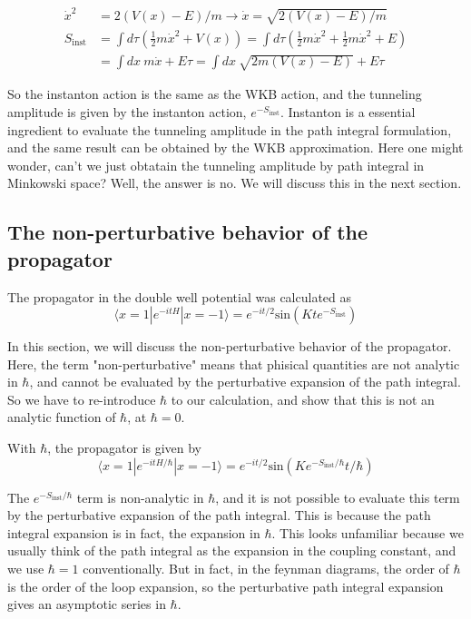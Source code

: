 \documentclass{article}
\begin{document}
\begin{align}
    \dot{x}^2&=2(V(x)-E)/m \rightarrow \dot{x} = \sqrt{2(V(x)-E)/m} \\
    S_{\text{inst}} &= \int d\tau \left( \frac{1}{2} m \dot{x}^2 + V(x) \right) = \int d\tau \left( \frac{1}{2} m \dot{x}^2 + \frac{1}{2} m \dot{x}^2 + E   \right) \\
    &= \int dx \ m\dot{x} + E\tau = \int dx \ \sqrt{2m(V(x)-E)} + E\tau 
\end{align}

So the instanton action is the same as the WKB action, and the tunneling amplitude is given by the instanton action, $e^{-S_{\text{inst}}}$.
Instanton is a essential ingredient to evaluate the tunneling amplitude in the path integral formulation, and the same result can be obtained by the WKB approximation.
Here one might wonder, can't we just obtatain the tunneling amplitude by path integral in Minkowski space? Well, the answer is no. We will discuss this in the next section.

\subsection{The non-perturbative behavior of the propagator}
The propagator in the double well potential was calculated as
\begin{equation}
    \langle x = 1 | e^{-itH} | x = -1 \rangle = e^{-it/2}  \text{sin}(Kt e^{-S_{\text{inst}}})
\end{equation}

In this section, we will discuss the non-perturbative behavior of the propagator.
Here, the term "non-perturbative" means that phisical quantities are not analytic in $\hbar$, and cannot be evaluated by the perturbative expansion of the path integral.
So we have to re-introduce $\hbar$ to our calculation, and show that this is not an analytic function of $\hbar$, at $\hbar = 0$.

With $\hbar$, the propagator is given by
\begin{equation}
    \langle x = 1 | e^{-itH/\hbar} | x = -1 \rangle = e^{-it/2}  \text{sin}(Ke^{-S_{\text{inst}}/\hbar} t/\hbar)
\end{equation}

The $e^{-S_{\text{inst}}/\hbar}$ term is non-analytic in $\hbar$, and it is not possible to evaluate this term by the perturbative expansion of the path integral.
This is because the path integral expansion is in fact, the expansion in $\hbar$. This looks unfamiliar because we usually think of the path integral as the expansion in the coupling constant, and we use $\hbar=1$ conventionally.
But in fact, in the feynman diagrams, the order of $\hbar$ is the order of the loop expansion, so the perturbative path integral expansion gives an asymptotic series in $\hbar$.
\end{document}
